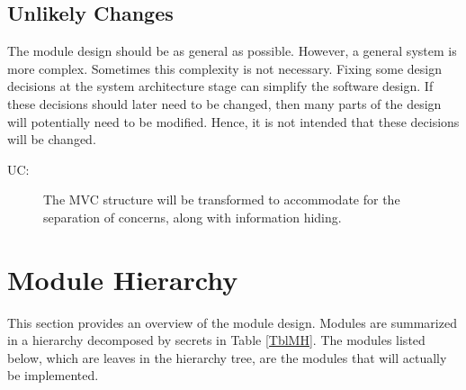 \documentclass[12pt, titlepage]{article}
\newcounter{ucnum}
\newcommand{\uctheucnum}{UC\theucnum}
\begin{document}
\subsection{Unlikely Changes} \label{SecUchange}

The module design should be as general as possible. However, a general system is
more complex. Sometimes this complexity is not necessary. Fixing some design
decisions at the system architecture stage can simplify the software design. If
these decisions should later need to be changed, then many parts of the design
will potentially need to be modified. Hence, it is not intended that these
decisions will be changed.

\begin{description}
\item[ \uctheucnum \label{ucIO}:] The MVC structure will be transformed to accommodate for the separation of concerns, along with information hiding.
\end{description}

\section{Module Hierarchy} \label{SecMH}

This section provides an overview of the module design. Modules are summarized
in a hierarchy decomposed by secrets in Table \ref{TblMH}. The modules listed
below, which are leaves in the hierarchy tree, are the modules that will
actually be implemented.
\end{document}
